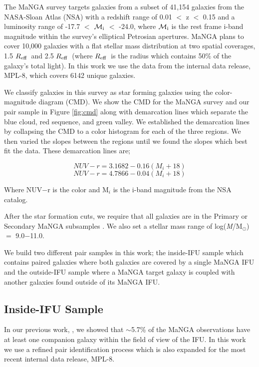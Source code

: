 \documentclass[iop,revtex4,twocolumn,apj,numberedappendix,appendixfloats]{emulateapj}
\newcommand{\reff}{$R_{\rm eff}$}
\newcommand{\logm}{log({\it M}/M$_{\odot}$)}
\begin{document}
The MaNGA survey targets galaxies from a subset of 41,154 galaxies from the NASA-Sloan Atlas (NSA) with a redshift range of 0.01 $<$ z $<$ 0.15 and a luminosity range of -17.7 $<$ $\mathcal{M_{\rm i}}$ $<$ -24.0, where $\mathcal{M_{\rm i}}$ is the rest frame i-band magnitude within the survey's elliptical Petrosian apertures. MaNGA plans to cover 10,000 galaxies with a flat stellar mass distribution at two spatial coverages, 1.5 \reff\ and 2.5 \reff\ (where \reff\ is the radius which contains 50\% of the galaxy's total light). In this work we use the data from the internal data release, MPL-8, which covers 6142 unique galaxies. 

We classify galaxies in this survey as star forming galaxies using the color-magnitude diagram (CMD). We show the CMD for the MaNGA survey and our pair sample in Figure \ref{fig:cmd} along with demarcation lines which separate the blue cloud, red sequence, and green valley. We established the demarcation lines by collapsing the CMD to a color histogram for each of the three regions. We then varied the slopes between the regions until we found the slopes which best fit the data. These demarcation lines are;

\begin{equation}\label{eq:blue}
NUV-r = 3.1682 - 0.16 (M_i+18)
\end{equation}
\begin{equation}\label{eq:red}
NUV-r = 4.7866 - 0.04 (M_i+18)
\end{equation}

Where NUV$-$r is the color and M$_i$ is the i-band magnitude from the NSA catalog. 

After the star formation cuts, we require that all galaxies are in the Primary or Secondary MaNGA subsamples \citep{Wake:2017}. We also set a stellar mass range of \logm\ $=$ 9.0$-$11.0.

We build two different pair samples in this work; the inside-IFU sample which contains paired galaxies where both galaxies are covered by a single MaNGA IFU and the outside-IFU sample where a MaNGA target galaxy is coupled with another galaxies found outside of its MaNGA IFU. 

\subsection{Inside-IFU Sample}\label{sec:inside}

In our previous work, \citet{Fu:2018}, we showed that $\sim$5.7\% of the MaNGA observations have at least one companion galaxy within the field of view of the IFU. In this work we use a refined pair identification process which is also expanded for the most recent internal data release, MPL-8.
\end{document}
